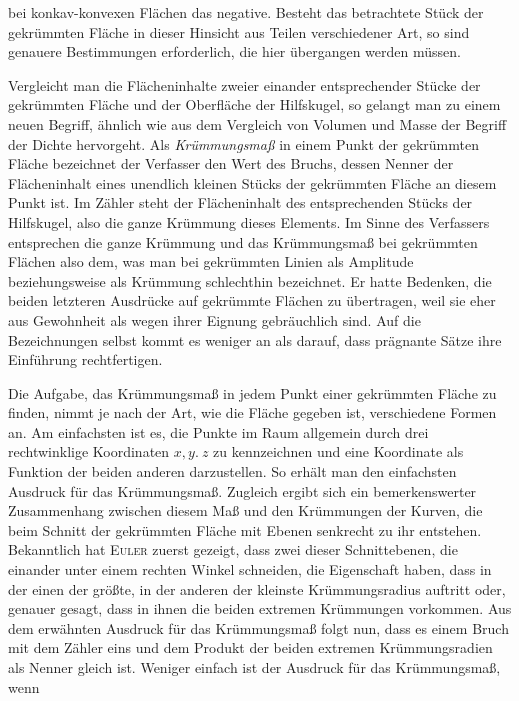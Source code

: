 %
bei konkav-konvexen Flächen das negative. Besteht das betrachtete Stück der gekrümmten Fläche in dieser Hinsicht aus Teilen verschiedener Art, so sind genauere Bestimmungen erforderlich, die hier übergangen werden müssen.

Vergleicht man die Flächeninhalte zweier einander entsprechender Stücke der gekrümmten Fläche und der Oberfläche der Hilfskugel, so gelangt man zu einem neuen Begriff, ähnlich wie aus dem Vergleich von Volumen und Masse der Begriff der Dichte hervorgeht. Als \textit{Krümmungsmaß} in einem Punkt der gekrümmten Fläche bezeichnet der Verfasser den Wert des Bruchs, dessen Nenner der Flächeninhalt eines unendlich kleinen Stücks der gekrümmten Fläche an diesem Punkt ist. Im Zähler steht der Flächeninhalt des entsprechenden Stücks der Hilfskugel, also die ganze Krümmung dieses Elements. Im Sinne des Verfassers entsprechen die ganze Krümmung und das Krümmungsmaß bei gekrümmten Flächen also dem, was man bei gekrümmten Linien als Amplitude beziehungsweise als Krümmung schlechthin bezeichnet. Er hatte Bedenken, die beiden letzteren Ausdrücke auf gekrümmte Flächen zu übertragen, weil sie eher aus Gewohnheit als wegen ihrer Eignung gebräuchlich sind. Auf die Bezeichnungen selbst kommt es weniger an als darauf, dass prägnante Sätze ihre Einführung rechtfertigen.

Die Aufgabe, das Krümmungsmaß in jedem Punkt einer gekrümmten Fläche zu finden, nimmt je nach der Art, wie die Fläche gegeben ist, verschiedene Formen an. Am einfachsten ist es, die Punkte im Raum allgemein durch drei rechtwinklige Koordinaten \(x,y.\ z\) zu kennzeichnen und eine Koordinate als Funktion der beiden anderen darzustellen. So erhält man den einfachsten Ausdruck für das Krümmungsmaß. Zugleich ergibt sich ein bemerkenswerter Zusammenhang zwischen diesem Maß und den Krümmungen der Kurven, die beim Schnitt der gekrümmten Fläche mit Ebenen senkrecht zu ihr entstehen. Bekanntlich hat \textsc{Euler} zuerst gezeigt, dass zwei dieser Schnittebenen, die einander unter einem rechten Winkel schneiden, die Eigenschaft haben, dass in der einen der größte, in der anderen der kleinste Krümmungsradius auftritt oder, genauer gesagt, dass in ihnen die beiden extremen Krümmungen vorkommen. Aus dem erwähnten Ausdruck für das Krümmungsmaß folgt nun, dass es einem Bruch mit dem Zähler eins und dem Produkt der beiden extremen Krümmungsradien als Nenner gleich ist. Weniger einfach ist der Ausdruck für das Krümmungsmaß, wenn
